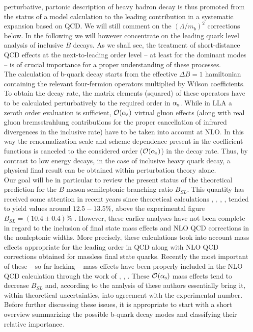 perturbative, partonic description of heavy hadron decay is thus
promoted from the status of a model calculation to the leading
contribution in a systematic expansion based on QCD.  We will still
comment on the $(\Lambda/m_b)^2$ corrections below.  In the following
we will however concentrate on the leading quark level analysis of
inclusive $B$ decays. As we shall see, the treatment of short-distance
QCD effects at the next-to-leading order level -- at least for the
dominant modes -- is of crucial importance for a proper understanding
of these processes.
\\
The calculation of b-quark decay starts from the effective 
$\Delta B=1$ hamiltonian containing the relevant four-fermion
operators multiplied by Wilson coefficients. To obtain the decay rate,
the matrix elements (squared) of these operators have to be calculated
perturbatively to the required order in $\alpha_{\rm s}$. While in LLA a
zeroth order evaluation is sufficient, ${\cal O}(\alpha_{\rm s})$ virtual
gluon effects (along with real gluon bremsstrahlung contributions for
the proper cancellation of infrared divergences in the inclusive rate)
have to be taken into account at NLO. In this way the renormalization
scale and scheme dependence present in the coefficient functions is
canceled to the considered order (${\cal  O}(\alpha_{\rm s})$) in the
decay rate. Thus, by contrast to low energy decays, in the case of
inclusive heavy quark decay, a physical final result can be obtained
within perturbation theory alone.
\\
Our goal will be in particular to review the present status of the
theoretical prediction for the $B$ meson semileptonic branching ratio
$B_{SL}$. This quantity has received some attention in recent years
since theoretical calculations \cite{altarellipetrarca:91},
\cite{tanimoto:92}, \cite{palmerstech:93}, \cite{bigietal:94},
\cite{falketal:94b} tended to yield values around $12.5-13.5\%$, above
the experimental figure $B_{SL}=(10.4\pm 0.4)\%$
\cite{particledata:94}.  However, these earlier analyses have not been
complete in regard to the inclusion of final state mass effects and NLO
QCD corrections in the nonleptonic widths. More precisely, these
calculations took into account mass effects appropriate for the leading
order in QCD along with NLO QCD corrections obtained for massless final
state quarks.  Recently the most important of these -- so far lacking
-- mass effects have been properly included in the NLO QCD calculation
through the work of \cite{baganetal:94a}, \cite{baganetal:94b},
\cite{baganetal:95}. These ${\cal O}(\alpha_{\rm s})$ mass effects tend to
decrease $B_{SL}$ and, according to the analysis of these authors
essentially bring it, within theoretical uncertainties, into agreement
with the experimental number.  Before further discussing these issues,
it is appropriate to start with a short overview summarizing the
possible b-quark decay modes and classifying their relative
importance.

